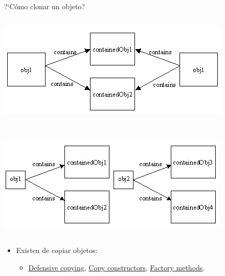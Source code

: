 \documentclass[10pt,envcountsect,spanish]{beamer}
\begin{document}
\begin{frame}{?`Cómo clonar un objeto?}
\begin{columns}
\begin{column}{.3\textwidth}
\centerline{\includegraphics[height=.2\textheight]{fig/copia1}}

\

\centerline{\includegraphics[height=.2\textheight]{fig/copia2}}

\end{column}
\end{columns}

\begin{itemize}
\item 
 Existen  de copiar objetos:
\begin{itemize}
\item \href{http://www.javapractices.com/topic/TopicAction.do?Id=15}{Defensive copying},
\href{http://www.javapractices.com/topic/TopicAction.do?Id=12}{Copy constructors},
\href{http://www.javapractices.com/topic/TopicAction.do?Id=21}{Factory methods}.
\end{itemize}
\end{itemize}


\end{frame}
\end{document}
